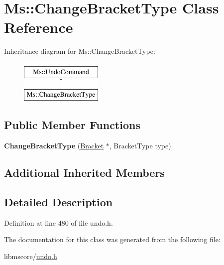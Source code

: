 \hypertarget{class_ms_1_1_change_bracket_type}{}\section{Ms\+:\+:Change\+Bracket\+Type Class Reference}
\label{class_ms_1_1_change_bracket_type}
Inheritance diagram for Ms\+:\+:Change\+Bracket\+Type\+:\begin{figure}[H]
\begin{center}
\leavevmode
\includegraphics[height=2.000000cm]{class_ms_1_1_change_bracket_type}
\end{center}
\end{figure}
\subsection*{Public Member Functions}
\begin{DoxyCompactItemize}
\item 
\mbox{\label{class_ms_1_1_change_bracket_type_aa1eae9940c366c76060721569f9db669}} 
{\bfseries Change\+Bracket\+Type} (\hyperlink{class_ms_1_1_bracket}{Bracket} $\ast$, Bracket\+Type type)
\end{DoxyCompactItemize}
\subsection*{Additional Inherited Members}


\subsection{Detailed Description}


Definition at line 480 of file undo.\+h.



The documentation for this class was generated from the following file\+:\begin{DoxyCompactItemize}
\item 
libmscore/\hyperlink{undo_8h}{undo.\+h}\end{DoxyCompactItemize}

